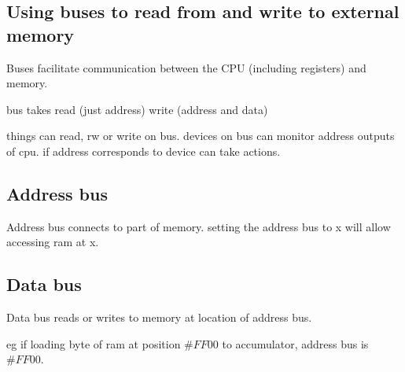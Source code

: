 

\subsection{Using buses to read from and write to external memory}

Buses facilitate communication between the CPU (including registers) and memory.

bus takes read (just address) write (address and data)

things can read, rw or write on bus. devices on bus can monitor address outputs of cpu. if address corresponds to device can take actions.

\subsection{Address bus}

Address bus connects to part of memory. setting the address bus to x will allow accessing ram at x.

\subsection{Data bus}

Data bus reads or writes to memory at location of address bus.

eg if loading byte of ram at position \(\#FF00\) to accumulator, address bus is \(\#FF00\).

